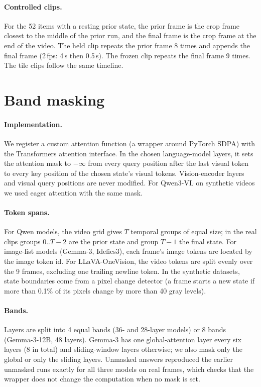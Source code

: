 \paragraph{Controlled clips.} For the 52 items with a resting prior state, the prior frame is the crop frame closest to the middle of the prior run, and the final frame is the crop frame at the end of the video. The held clip repeats the prior frame 8 times and appends the final frame (2\,fps: 4\,s then 0.5\,s). The frozen clip repeats the final frame 9 times. The tile clips follow the same timeline.

\section{Band masking}
\label{app:mask}

\paragraph{Implementation.} We register a custom attention function (a wrapper around PyTorch SDPA) with the Transformers attention interface. In the chosen language-model layers, it sets the attention mask to $-\infty$ from every query position after the last visual token to every key position of the chosen state's visual tokens. Vision-encoder layers and visual query positions are never modified. For Qwen3-VL on synthetic videos we used eager attention with the same mask.

\paragraph{Token spans.} For Qwen models, the video grid gives $T$ temporal groups of equal size; in the real clips groups $0..T{-}2$ are the prior state and group $T{-}1$ the final state. For image-list models (Gemma-3, Idefics3), each frame's image tokens are located by the image token id. For LLaVA-OneVision, the video tokens are split evenly over the 9 frames, excluding one trailing newline token. In the synthetic datasets, state boundaries come from a pixel change detector (a frame starts a new state if more than 0.1\% of its pixels change by more than 40 gray levels).

\paragraph{Bands.} Layers are split into 4 equal bands (36- and 28-layer models) or 8 bands (Gemma-3-12B, 48 layers). Gemma-3 has one global-attention layer every six layers (8 in total) and sliding-window layers otherwise; we also mask only the global or only the sliding layers. Unmasked answers reproduced the earlier unmasked runs exactly for all three models on real frames, which checks that the wrapper does not change the computation when no mask is set.

